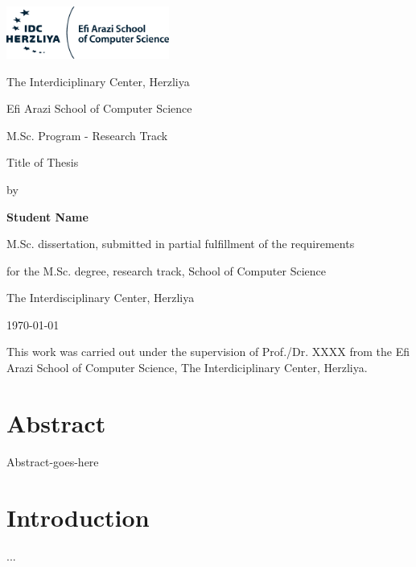 \documentclass[12pt]{article}
\begin{document}
\begin{titlepage}
	\centering
	\includegraphics[width=0.4\textwidth]{../img/IDC_logo}\par\vspace{2cm}
	{\huge The Interdiciplinary Center, Herzliya \par}
	{\Large Efi Arazi School of Computer Science \par}
	{\Large M.Sc. Program - Research Track \par}
	
	\vspace{1cm}
	
	\vspace{1.5cm}
	{\Huge Title of Thesis\par}
	\vspace{3cm}
	{\large by\par}
	{\large\bfseries Student Name\par}
	
	\vspace{2cm}
	{M.Sc. dissertation, submitted in partial fulfillment of the requirements\par}
	{for the M.Sc. degree, research track, School of Computer Science\par}
	{The Interdisciplinary Center, Herzliya}
	
	\vfill
	
	{\large \monthyeardate\today \par}
	
\end{titlepage}

\newpage

This work was carried out under the supervision of Prof./Dr. XXXX from the Efi Arazi School of Computer Science, The	Interdiciplinary Center, Herzliya.

\newpage

\section*{Abstract}
Abstract-goes-here	


\newpage

\tableofcontents

\newpage

\section{Introduction}
...
\end{document}
